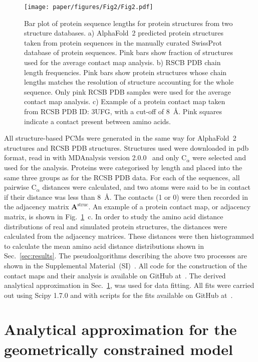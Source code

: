 \documentclass[
reprint,
twocolumn,
amsmath,amssymb,superscriptaddress,aps,
pre]{revtex4-1}
\begin{document}
 \begin{figure}[htb]
        \centering
	\texttt{[image: paper/figures/Fig2/Fig2.pdf]}
	    \caption{Bar plot of protein sequence lengths for protein structures from two structure databases. a) AlphaFold~2 predicted protein structures taken from protein sequences in the manually curated SwissProt database of protein sequences. Pink bars show fraction of structures used for the average contact map analysis. b) RSCB PDB chain length frequencies. Pink bars show protein structures whose chain lengths matches the resolution of structure accounting for the whole sequence. Only pink RCSB PDB samples were used for the average contact map analysis. c) Example of a protein contact map taken from RCSB PDB ID: 3UFG, with a cut-off of 8~Å. Pink squares indicate a contact present between amino acids.}
        \label{fig:pdb_stats}
\end{figure}
All structure-based PCMs were generated in the same way for AlphaFold~2 structures and RCSB PDB structures. Structures used were downloaded in pdb format, read in with MDAnalysis version 2.0.0~\cite{gowers2016mdanalysis} and only C$_{\alpha}$ were selected and used for the analysis. Proteins were categorised by length and placed into the same three groups as for the RCSB PDB data. For each of the sequences, all pairwise C$_\alpha$ distances were calculated, and two atoms were said to be in contact if their distance was less than 8~Å. The contacts (1 or 0) were then recorded in the adjacency matrix $\mathbf{A}^{\mathrm{struc}}$. An example of a protein contact map, or adjacency matrix, is shown in Fig.~\ref{fig:pdb_stats}~c. In order to study the amino acid distance distributions of real and simulated protein structures, the distances were calculated from the adjacency matrices. These distances were then histogrammed to calculate the mean amino acid distance distributions shown in Sec.~\ref{sec:results}. The pseudoalgorithms describing the above two processes are shown in the Supplemental Material~(SI)~\cite{SI}. All code for the construction of the contact maps and their analysis is available on GitHub at~\cite{2022sequence}. The derived analytical approximation in Sec.~\ref{sec:theory}, was used for data fitting. All fits were carried out using Scipy 1.7.0 and with scripts for the fits available on GitHub at~\cite{2022sequence}.

\section{Analytical approximation for the geometrically constrained model}\label{sec:theory}
\end{document}
